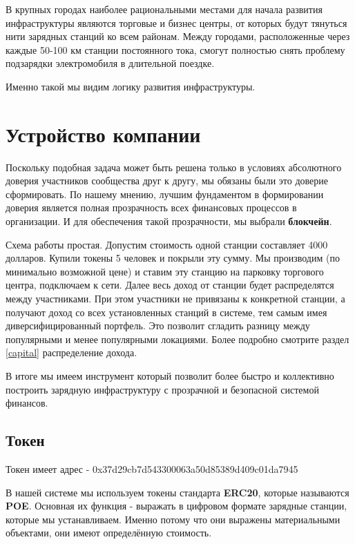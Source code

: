 \documentclass[a4paper,12pt]{report}
\newcommand{\contractAddress}{0x37d29cb7d543300063a50d85389d409c01da7945}
\begin{document}
В крупных городах наиболее рациональными местами для начала развития инфраструктуры являются торговые и бизнес центры, от которых будут тянуться нити зарядных станций ко всем районам. Между городами, расположенные через каждые 50-100 км станции постоянного тока, смогут полностью снять проблему подзарядки электромобиля в длительной поездке. 

Именно такой мы видим логику развития инфраструктуры.


\vspace*{1cm}

\chapter{Устройство компании}
Поскольку подобная задача может быть решена только в условиях абсолютного доверия участников сообщества друг к другу, мы обязаны были это доверие сформировать. По нашему мнению, лучшим фундаментом в формировании доверия является полная прозрачность всех финансовых процессов в организации. И для обеспечения такой прозрачности, мы выбрали \textbf{блокчейн}. 

Схема работы простая. Допустим стоимость одной станции составляет 4000 долларов. Купили токены 5 человек и покрыли эту сумму. Мы производим (по минимально возможной цене) и ставим эту станцию на парковку торгового центра, подключаем к сети. 
Далее весь доход от станции будет распределятся между участниками. При этом участники не привязаны к конкретной станции, а получают доход со всех установленных станций в системе, тем самым имея диверсифицированный портфель. Это позволит сгладить разницу между популярными и менее популярными локациями. 
Более подробно смотрите раздел \ref{capital} распределение дохода.

В итоге мы имеем инструмент который позволит более быстро и коллективно построить зарядную инфраструктуру с прозрачной и безопасной системой финансов.

\section{Токен}

Токен имеет адрес - \contractAddress 

В нашей системе мы используем токены стандарта \textbf{ERC20}, которые называются \textbf{POE}. Основная их функция - выражать в цифровом формате зарядные станции, которые мы устанавливаем. Именно потому что они выражены материальными объектами, они имеют
определённую стоимость.
\end{document}
